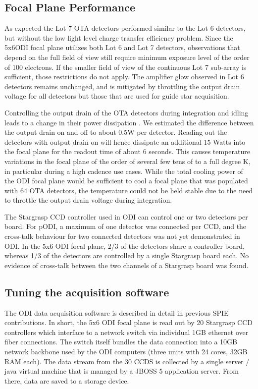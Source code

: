 \documentclass[]{spieman}
\begin{document}
\subsection{Focal Plane  Performance}

As expected the Lot 7 OTA detectors performed similar to the Lot 6 detectors,
but without the low light level charge transfer efficiency problem. Since the
5x6ODI focal plane  utilizes  both Lot 6 and Lot 7 detectors, observations that
depend on the full field of view still require minimum exposure level of the
order of 100 electrons. If the smaller field of view of the continuous Lot 7
sub-array is sufficient, those restrictions do not apply. The amplifier glow
observed in Lot 6 detectors remains unchanged, and is mitigated by throttling 
the output drain voltage for all detectors but those that are used for guide
star acquisition.

Controlling the output drain of the OTA detectors during integration and idling
leads to a change in their power dissipation . We estimated the  difference
between the output drain on and off to about 0.5W per detector. Reading out the
detectors with output drain on will hence dissipate an additional 15 Watts into
the focal plane for the readout time of about 6 seconds. This causes temperature
variations in the focal plane of the order of several  few tens of to a full
degree K, in particular during a high cadence use cases. While the total cooling
power of the ODI focal plane would be sufficient to cool a focal plane that was
populated with 64 OTA detectors, the temperature could not be held stable due to
the need to throttle the output drain voltage during integration.


The Stargrasp CCD controller\cite{Onaka2008} used in ODI can control one or two
detectors per board. For pODI, a maximum of one detector was connected per CCD,
and the cross-talk behaviour for two connected detectors was not yet
demonstrated in ODI. In the 5x6 ODI focal plane, 2/3 of the detectors share a
controller board, whereas 1/3 of the detectors are controlled by a single
Stargrasp board each. No evidence of cross-talk between the two channels of a
Stargrasp board was found.



\subsection{Tuning the acquisition software}

The ODI data acquisition software is described in detail in previous SPIE
contributions\cite{Yeatts2008,Yeatts2010}. In short, the 5x6 ODI focal plane is
read out by 20 Stargrasp CCD controllers which interface to a network switch via
individual  1GB ethernet over fiber connections. The switch itself bundles the
data connection into a 10GB network backbone used by the ODI computers (three
units with 24 cores, 32GB RAM each). The data stream from the 30 CCDS is
collected by a single server / java virtual machine that is managed by a JBOSS 5
application server. From there, data are saved to a storage device.
\end{document}
